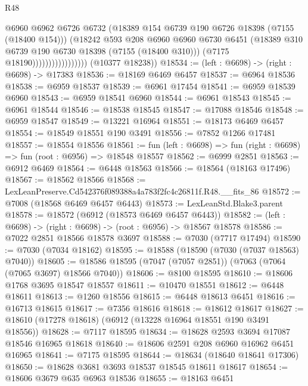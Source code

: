 \begin{lexlean}{R48}
\begin{coremodule}
                                    @6960
                                    @6962
                                    @6726
                                    @6732
                                    (@18389 @154 @6739 @190 @6726 @18398 (@7155 (@18400 @154)))
                                    (@18242
                                      @593
                                      @208
                                      @6960
                                      @6960
                                      @6730
                                      @6451
                                      (@18389 @310 @6739 @190 @6730 @18398 (@7155 (@18400 @310)))
                                      (@7175 @18190)))))))))))))))))
      (@10377 @18238))
@18534 := (left : @6698) -> (right : @6698) -> @17383
@18536 := @18169 @6469 @6457
@18537 := @6964 @18536
@18538 := @6959 @18537
@18539 := @6961 @17454
@18541 := @6959 @18539 @6960
@18543 := @6959 @18541 @6960
@18544 := @6961 @18543
@18545 := @6961 @18544
@18546 := @18538 @18545
@18547 := @17088 @18546
@18548 := @6959 @18547
@18549 := @13221 @16964
@18551 := @18173 @6469 @6457
@18554 := @18549 @18551 @190 @3491
@18556 := @7852 @1266 @17481
@18557 := @18554 @18556
@18561 := fun (left : @6698) => fun (right : @6698) => fun (root : @6956) => @18548 @18557
@18562 := @6999 @2851
@18563 := @6912 @6469
@18564 := @6448 @18563
@18566 := @18564 (@18163 @17496)
@18567 := @18562 @18566
@18568 := LexLeanPreserve.Cd542376f089388a4a783f2fc4c26811f.R48.__fits_86
@18572 := @7008 (@18568 @6469 @6457 @6443)
@18573 := LexLeanStd.Blake3.parent
@18578 := @18572 (@6912 (@18573 @6469 @6457 @6443))
@18582 := (left : @6698) -> (right : @6698) -> (root : @6956) -> @18567 @18578
@18586 := @7022 @2851 @18566 @18578 @3697
@18588 := @7030 (@7717 @17494)
@18590 := @7030 (@7034 @18162)
@18595 := @18588 (@18590 (@7030 (@7037 @18563) @7040))
@18605 := @18586 @18595 (@7047 (@7057 @2851)) (@7063 (@7064 (@7065 @3697) @18566 @7040))
@18606 := @8100 @18595
@18610 := @18606 @1768 @3695 @18547 @18557
@18611 := @10470 @18551
@18612 := @6448 @18611
@18613 := @1260 @18556
@18615 := @6448 @18613 @6451
@18616 := @16713 @18615
@18617 := @7356 @18616
@18618 := @18612 @18617
@18627 := @18610 (@17278 @18618) (@6912 (@13228 @16964 @18551 @190 @3491 @18556))
@18628 := @7117 @18595
@18634 := @18628 @2593 @3694 @17087 @18546 @16965 @18618
@18640 := @18606 @2591 @208 @6960 @16962 @6451 @16965
@18641 := @7175 @18595
@18644 := @18634 (@18640 @18641 @17306)
@18650 := @18628 @3681 @3693 @18537 @18545 @18611 @18617
@18654 := @18606 @3679 @635 @6963 @18536
@18655 := @18163 @6451

\end{coremodule}
\end{lexlean}
